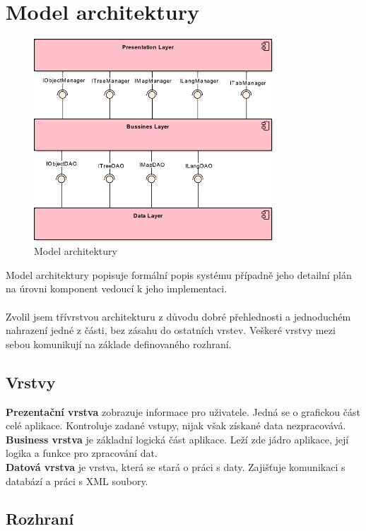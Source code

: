 \documentclass[thesis=B,czech]{resources/FITthesis}[2012/06/26]
\begin{document}
	\section{Model architektury}
\begin{figure}\centering
	\includegraphics[width=0.8\textwidth]{images/architektura}
	\caption[Model architektury]{Model architektury}\label{fig:architektura}
\end{figure}
Model architektury popisuje formální popis systému případně jeho detailní plán na úrovni komponent vedoucí k jeho implementaci.\\
\\
Zvolil jsem třívrstvou architekturu z důvodu dobré přehlednosti a jednoduchém nahrazení jedné z části, bez zásahu do ostatních vrstev. Veškeré vrstvy mezi sebou komunikují na základe definovaného rozhraní.\\
\subsection{Vrstvy}
\textbf{Prezentační vrstva} zobrazuje informace pro uživatele. Jedná se o grafickou část celé aplikace. Kontroluje zadané vstupy, nijak však získané data nezpracovává.\\
\textbf{Business vrstva} je základní logická část aplikace. Leží zde jádro aplikace, její logika a funkce pro zpracování dat.\\
\textbf{Datová vrstva} je vrstva, která se stará o práci s daty. Zajišťuje komunikaci s databází a práci s XML soubory.\\
\subsection{Rozhraní}
\end{document}
